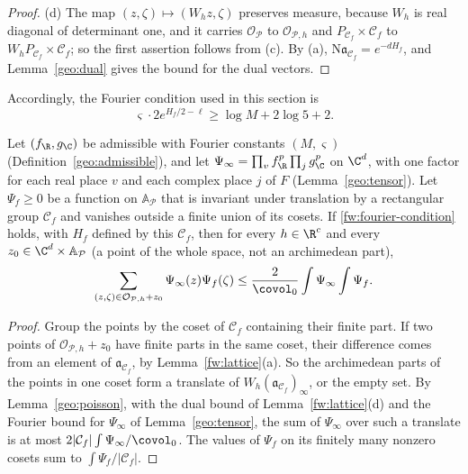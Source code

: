 \begin{proof}
(d) The map $(z,\zeta)\mapsto(W_hz,\zeta)$ preserves measure, because
$W_h$ is real diagonal of determinant one, and it carries $\mathcal O_{\mathcal P}$ to
$\mathcal O_{\mathcal P,h}$ and $P_{\mathcal C_f}\times\mathcal C_f$ to $W_hP_{\mathcal C_f}\times\mathcal C_f$; so the first assertion follows from (c). By (a),
$\mathrm N\mathfrak a_{\mathcal C_f}=e^{-dH_f}$, and Lemma~\ref{geo:dual} gives the bound for
the dual vectors.
\end{proof}

Accordingly, the Fourier condition used in this section is
\begin{equation}\label{fw:fourier-condition}
 \varsigma\cdot2e^{H_f/2-\ell}\ge\log M+2\log5+2 .
\end{equation}

\begin{lemma}\label{fw:counting}
Let $(f_\R,g_\C)$ be admissible with Fourier constants $(M,\varsigma)$
(Definition~\ref{geo:admissible}), and
let $\Psi_\infty=\prod_vf_\R^p\prod_jg_\C^p$ on $\C^d$, with one factor
for each real place $v$ and each complex place $j$ of $F$
(Lemma~\ref{geo:tensor}). Let $\Psi_f\ge0$ be a function on $\mathbb
A_{\mathcal P}$ that is invariant under translation by a rectangular
group $\mathcal C_f$ and vanishes outside a finite union of its cosets.
If \eqref{fw:fourier-condition} holds, with $H_f$ defined by this
$\mathcal C_f$, then for every $h\in\R^c$ and every
$z_0\in\C^d\times\mathbb A_{\mathcal P}$ (a point of the whole space,
not an archimedean part),
\begin{equation}\label{fw:weighted-count}
 \sum_{(z,\zeta)\in\mathcal O_{\mathcal P,h}+z_0}\Psi_\infty(z)\Psi_f(\zeta)
 \le\frac2{\covol_0}\int\Psi_\infty\int\Psi_f .
\end{equation}
\end{lemma}

\begin{proof}
Group the points by the coset of $\mathcal C_f$ containing their finite
part. If two points of $\mathcal O_{\mathcal P,h}+z_0$ have finite parts in the same
coset, their difference comes from an element of $\mathfrak a_{\mathcal C_f}$, by
Lemma~\ref{fw:lattice}(a). So the archimedean parts of the points in one
coset form a translate of $W_h(\mathfrak a_{\mathcal C_f})_\infty$, or the empty set. By
Lemma~\ref{geo:poisson}, with the dual bound of
Lemma~\ref{fw:lattice}(d) and the Fourier bound for $\Psi_\infty$ of
Lemma~\ref{geo:tensor}, the sum of $\Psi_\infty$ over such a translate
is at most $2|\mathcal C_f|\int\Psi_\infty/\covol_0$. The values of
$\Psi_f$ on its finitely many nonzero cosets sum to
$\int\Psi_f/|\mathcal C_f|$.
\end{proof}

